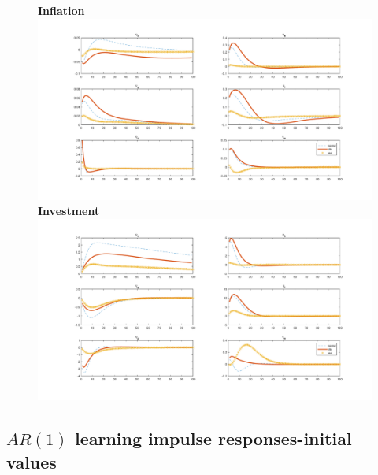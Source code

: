 \documentclass[12pt,reqno]{article}
\numberwithin{equation}{section}
\begin{document}
\begin{figure}[H]
\textbf{Inflation}\\
\includegraphics[scale=0.4]{MSV_impresp_pinf.pdf}\\
\textbf{Investment}\\
\includegraphics[scale=0.4]{MSV_impresp_inve.pdf}\\
\end{figure}



\newpage
\subsection*{$AR(1)$ learning impulse responses-initial values}
\end{document}
